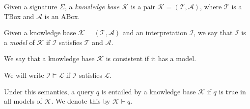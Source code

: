 \begin{definition}
    Given a signature $\Sigma$, a \emph{knowledge base} $\mathcal{K}$ is a pair $\mathcal{K} = (\mathcal{T}, \mathcal{A})$,
    where $\mathcal{T}$ is a TBox and $\mathcal{A}$ is an ABox.
\end{definition}

\begin{definition}[Model]
    Given a knowledge base $\mathcal{K} = (\mathcal{T}, \mathcal{A})$ and an interpretation $\mathcal{I}$,
    we say that $\mathcal{I}$ is a \emph{model} of $\mathcal{K}$ if $\mathcal{I}$ satisfies $\mathcal{T}$ and $\mathcal{A}$.

    We say that a knowledge base $\mathcal{K}$ is
consistent if it has a model.
\end{definition}

\begin{notation}[Satisfiability]
    We will write $\mathcal{I}\vDash\mathcal{L}$ if $\mathcal{I}$ satisfies $\mathcal{L}$.
\end{notation}

Under this semantics, a query $q$ is entailed by a knowledge base $\mathcal{K}$ if $q$ is true in 
all models of $\mathcal{K}$.
We denote this by $\mathcal{K} \vdash q$.